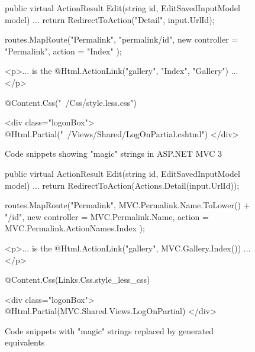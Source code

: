 \begin{figure}[h!]
	\begin{Csharp}
public virtual ActionResult Edit(string id, EditSavedInputModel model) {
	...
	return RedirectToAction("Detail", input.UrlId);
}
	\end{Csharp}
	
	\begin{Csharp}
routes.MapRoute("Permalink",
	"permalink/{id}",
	new { controller = "Permalink", action = "Index" }
);
	\end{Csharp}
	
	\begin{Razor}
<p>... is the @Html.ActionLink("gallery", "Index", "Gallery") ...</p>
	\end{Razor}
	
	\begin{Razor}
@Content.Css("~/Css/style.less.css")
	\end{Razor}
	
	\begin{Razor}
<div class="logonBox">
	@Html.Partial("~/Views/Shared/LogOnPartial.cshtml")
</div>
	\end{Razor}
	
	\caption{Code snippets showing "magic" strings in ASP.NET MVC 3}
	\label{fig:T4MVCnotUsed}
\end{figure}



\begin{figure}[h!]
	\begin{Csharp}
public virtual ActionResult Edit(string id, EditSavedInputModel model) {
	...
	return RedirectToAction(Actions.Detail(input.UrlId));
}
	\end{Csharp}
	
	\begin{Csharp}
routes.MapRoute("Permalink",
	MVC.Permalink.Name.ToLower() + "/{id}",
	new { controller = MVC.Permalink.Name, action = MVC.Permalink.ActionNames.Index }
);
	\end{Csharp}
	
	
	\begin{Razor}
<p>... is the @Html.ActionLink("gallery", MVC.Gallery.Index()) ...</p>
	\end{Razor}
	
	\begin{Razor}
@Content.Css(Links.Css.style_less_css)
	\end{Razor}
	
	\begin{Razor}
<div class="logonBox">
	@Html.Partial(MVC.Shared.Views.LogOnPartial)
</div>
	\end{Razor}
	
	\caption{Code snippets with "magic" strings replaced by generated equivalents}
	\label{fig:T4MVCused}
\end{figure}



